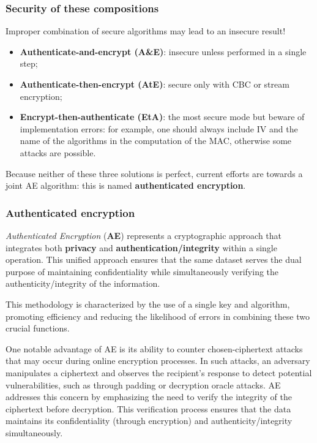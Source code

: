 \subsubsection{Security of these compositions}
Improper combination of secure algorithms may lead to an insecure result!
\begin{itemize}
    \item \textbf{Authenticate-and-encrypt (A\&E)}: insecure unless performed in a single step;
    \item \textbf{Authenticate-then-encrypt (AtE)}: secure only with CBC or stream encryption;
    \item \textbf{Encrypt-then-authenticate (EtA)}: the most secure mode but beware of implementation errors: for example, one should always include IV and the name of the algorithms in the computation of the MAC, otherwise some attacks are possible.
\end{itemize}
Because neither of these three solutions is perfect, current efforts are towards a joint AE algorithm: this is named \textbf{authenticated encryption}.


\subsubsection{Authenticated encryption}\label{chap:ae}

\textit{Authenticated Encryption} (\textbf{AE}) represents a cryptographic approach that integrates both \textbf{privacy} and \textbf{authentication/integrity} within a single operation.
This unified approach ensures that the same dataset serves the dual purpose of maintaining confidentiality while simultaneously verifying the authenticity/integrity of the information.

This methodology is characterized by the use of a single key and algorithm, promoting efficiency and reducing the likelihood of errors in combining these two crucial functions.

One notable advantage of AE is its ability to counter chosen-ciphertext attacks that may occur during online encryption processes. In such attacks, an adversary manipulates a ciphertext and observes the recipient's response to detect potential vulnerabilities, such as through padding or decryption oracle attacks. AE addresses this concern by emphasizing the need to verify the integrity of the ciphertext before decryption. This verification process ensures that the data maintains its confidentiality (through encryption) and authenticity/integrity simultaneously.


